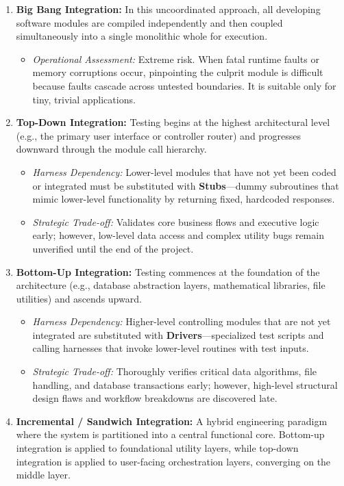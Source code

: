 \documentclass[11pt,a4paper]{article}
\begin{document}
\begin{enumerate}
    \item \textbf{Big Bang Integration:} In this uncoordinated approach, all developing software modules are compiled independently and then coupled simultaneously into a single monolithic whole for execution.
    \begin{itemize}
        \item \textit{Operational Assessment:} Extreme risk. When fatal runtime faults or memory corruptions occur, pinpointing the culprit module is difficult because faults cascade across untested boundaries. It is suitable only for tiny, trivial applications.
    \end{itemize}
    \item \textbf{Top-Down Integration:} Testing begins at the highest architectural level (e.g., the primary user interface or controller router) and progresses downward through the module call hierarchy.
    \begin{itemize}
        \item \textit{Harness Dependency:} Lower-level modules that have not yet been coded or integrated must be substituted with \textbf{Stubs}---dummy subroutines that mimic lower-level functionality by returning fixed, hardcoded responses.
        \item \textit{Strategic Trade-off:} Validates core business flows and executive logic early; however, low-level data access and complex utility bugs remain unverified until the end of the project.
    \end{itemize}
    \item \textbf{Bottom-Up Integration:} Testing commences at the foundation of the architecture (e.g., database abstraction layers, mathematical libraries, file utilities) and ascends upward.
    \begin{itemize}
        \item \textit{Harness Dependency:} Higher-level controlling modules that are not yet integrated are substituted with \textbf{Drivers}---specialized test scripts and calling harnesses that invoke lower-level routines with test inputs.
        \item \textit{Strategic Trade-off:} Thoroughly verifies critical data algorithms, file handling, and database transactions early; however, high-level structural design flaws and workflow breakdowns are discovered late.
    \end{itemize}
    \item \textbf{Incremental / Sandwich Integration:} A hybrid engineering paradigm where the system is partitioned into a central functional core. Bottom-up integration is applied to foundational utility layers, while top-down integration is applied to user-facing orchestration layers, converging on the middle layer.
\end{enumerate}
\end{document}
